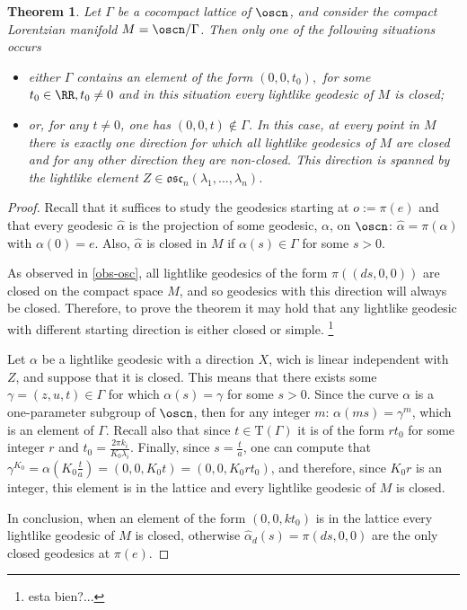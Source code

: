 \documentclass[12pt]{amsart}
\theoremstyle{plain}
\newtheorem{thm}{Theorem}[section]
\theoremstyle{definition}
\theoremstyle{remark}
\begin{document}
		\begin{thm}\label{teoremaoscilador}
			Let $\Gamma$ be a cocompact lattice of $\oscn$, and consider the compact Lorentzian manifold $M=\oscn/\Gamma$. Then only one of the following situations occurs
			\begin{itemize}
				\item either $\Gamma$ contains an element of the form $(0,0,t_0),$ for some $t_0\in \RR, t_0 \neq 0$ and in this situation every lightlike geodesic of $M$ is closed;
				\item or, for any $t \neq 0$, one has $(0,0,t) \notin \Gamma$. In this case,   at every point in $M$ there is exactly one direction for which all lightlike geodesics of $M$ are closed and for any other direction they are non-closed. This direction is spanned by the lightlike element $Z \in \mathfrak{osc}_n(\lambda_1, ..., \lambda_n)$.		
			\end{itemize}
			
		\end{thm}
		
		\begin{proof}
			Recall that it suffices to study the geodesics starting at $o:=\pi(e)$ and that every geodesic $\hat{\alpha}$ is the projection of some geodesic, $\alpha$, on $\oscn$: $\hat{\alpha}=\pi(\alpha)$ with $\alpha(0)=e$. Also, $\hat{\alpha}$ is closed in $M$ if $\alpha(s) \in \Gamma$ for some $s>0$.
			
			As observed in \ref{obs-osc}, all lightlike geodesics of the form $\pi((ds,0,0))$ are closed on the compact space $M$, and so geodesics with  this direction will  always be closed. Therefore, to prove the theorem it may hold that any lightlike geodesic with different starting direction is either closed or simple. \footnote{{\color{red} esta bien?...}}
			
			Let $\alpha$ be a lightlike geodesic with a direction $X$, wich is linear independent with $Z$, and suppose that  it is closed. This means that there exists some $\gamma=(z,u,t) \in \Gamma$ for which $\alpha(s)=\gamma$ for some $s>0$. Since the curve $\alpha$ is a one-parameter subgroup of $\oscn$, then for any integer $m$: $\alpha(m s)=\gamma^m$, which is an element of $\Gamma$. Recall also that since $t \in \mathrm{T}(\Gamma)$ it is of the form $r t_0$ for some integer $r$ and $t_0=\frac{2 \pi k_i}{K_0 \lambda_i}$. Finally, since $s=\frac{t}{a}$, one can compute that $\gamma^{K_0} = \alpha(K_0 \frac{t}{a}) = (0,0,K_0 t) = (0,0,K_0 r t_0)$, and therefore, since $K_0 r$ is an integer, this element is in the lattice and every lightlike geodesic of $M$ is closed.
			
			In conclusion, when an element of the form $(0,0,k t_0)$ is in the lattice every lightlike geodesic of $M$ is closed, otherwise $\hat{\alpha}_d(s)=\pi(ds,0,0)$ are the only closed  geodesics at $\pi(e)$.			
		\end{proof}
		
\end{document}
